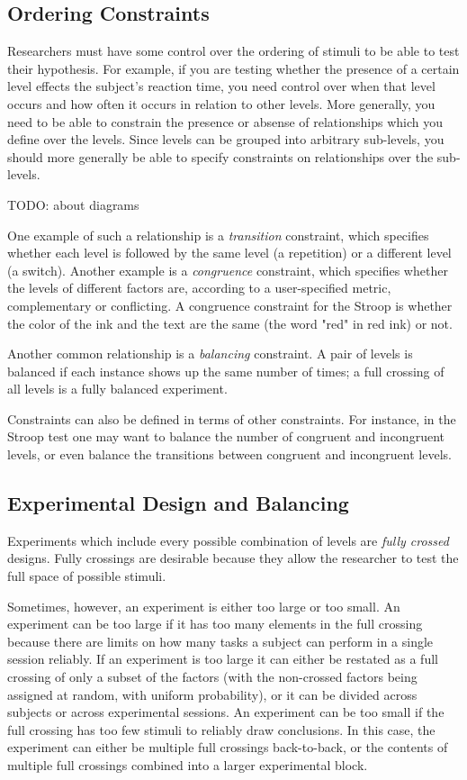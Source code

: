 \subsection{Ordering Constraints}

Researchers must have some control over the ordering of stimuli to be able to test their hypothesis. For example, if you are testing whether the presence of a certain level effects the subject's reaction time, you need control over when that level occurs and how often it occurs in relation to other levels. More generally, you need to be able to constrain the presence or absense of relationships which you define over the levels. Since levels can be grouped into arbitrary sub-levels, you should more generally be able to specify constraints on relationships over the sub-levels.

TODO: about diagrams

One example of such a relationship is a \emph{transition} constraint, which specifies whether each level is followed by the same level (a repetition) or a different level (a switch). Another example is a \emph{congruence} constraint, which specifies whether the levels of different factors are, according to a user-specified metric, complementary or conflicting. A congruence constraint for the Stroop is whether the color of the ink and the text are the same (the word "red" in red ink) or not.

Another common relationship is a \emph{balancing} constraint. A pair of levels is balanced if each instance shows up the same number of times; a full crossing of all levels is a fully balanced experiment.

Constraints can also be defined in terms of other constraints. For instance, in the Stroop test one may want to balance the number of congruent and incongruent levels, or even balance the transitions between congruent and incongruent levels.

\subsection{Experimental Design and Balancing}

Experiments which include every possible combination of levels are \emph{fully crossed} designs. Fully crossings are desirable because they allow the researcher to test the full space of possible stimuli.

Sometimes, however, an experiment is either too large or too small. An experiment can be too large if it has too many elements in the full crossing because there are limits on how many tasks a subject can perform in a single session reliably. If an experiment is too large it can either be restated as a full crossing of only a subset of the factors (with the non-crossed factors being assigned at random, with uniform probability), or it can be divided across subjects or across experimental sessions. An experiment can be too small if the full crossing has too few stimuli to reliably draw conclusions. In this case, the experiment can either be multiple full crossings back-to-back, or the contents of multiple full crossings combined into a larger experimental block.



